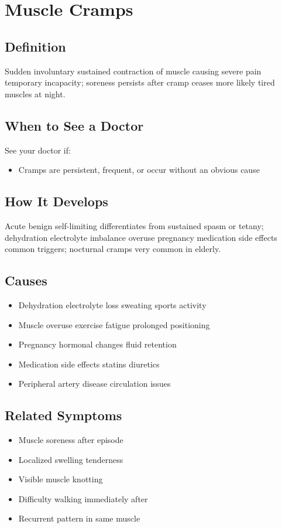 \chapter{Muscle Cramps}

\section*{Definition}
Sudden involuntary sustained contraction of muscle causing severe pain temporary incapacity; soreness persists after cramp ceases more likely tired muscles at night.

\section*{When to See a Doctor}
See your doctor if:
\begin{itemize}
  \item Cramps are persistent, frequent, or occur without an obvious cause
\end{itemize}

\section*{How It Develops}
Acute benign self-limiting differentiates from sustained spasm or tetany; dehydration electrolyte imbalance overuse pregnancy medication side effects common triggers; nocturnal cramps very common in elderly.

\section*{Causes}
\begin{itemize}
  \item Dehydration electrolyte loss sweating sports activity
  \item Muscle overuse exercise fatigue prolonged positioning
  \item Pregnancy hormonal changes fluid retention
  \item Medication side effects statins diuretics
  \item Peripheral artery disease circulation issues
\end{itemize}

\section*{Related Symptoms}
\begin{itemize}
  \item Muscle soreness after episode
  \item Localized swelling tenderness
  \item Visible muscle knotting
  \item Difficulty walking immediately after
  \item Recurrent pattern in same muscle
\end{itemize}


